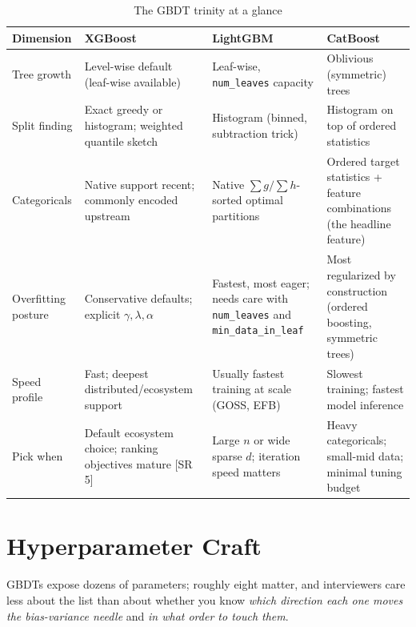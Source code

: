 \begin{table}[H]
\centering
\small
\caption{The GBDT trinity at a glance}
\label{cml:tab:gbdt_libraries}
\begin{tabularx}{\textwidth}{lXXX}
\toprule
\textbf{Dimension} & \textbf{XGBoost} & \textbf{LightGBM} & \textbf{CatBoost} \\
\midrule
Tree growth & Level-wise default (leaf-wise available) & Leaf-wise, \texttt{num\_leaves} capacity & Oblivious (symmetric) trees \\
Split finding & Exact greedy or histogram; weighted quantile sketch & Histogram (binned, subtraction trick) & Histogram on top of ordered statistics \\
Categoricals & Native support recent; commonly encoded upstream & Native $\sum g/\sum h$-sorted optimal partitions & Ordered target statistics + feature combinations (the headline feature) \\
Overfitting posture & Conservative defaults; explicit $\gamma, \lambda, \alpha$ & Fastest, most eager; needs care with \texttt{num\_leaves} and \texttt{min\_data\_in\_leaf} & Most regularized by construction (ordered boosting, symmetric trees) \\
Speed profile & Fast; deepest distributed/ecosystem support & Usually fastest training at scale (GOSS, EFB) & Slowest training; fastest model inference \\
Pick when & Default ecosystem choice; ranking objectives mature [SR 5] & Large $n$ or wide sparse $d$; iteration speed matters & Heavy categoricals; small-mid data; minimal tuning budget \\
\bottomrule
\end{tabularx}
\end{table}

\section{Hyperparameter Craft}
\label{cml:sec:hyperparam}

GBDTs expose dozens of parameters; roughly eight matter, and interviewers care less about the list than about whether you know \textit{which direction each one moves the bias-variance needle} and \textit{in what order to touch them}.

